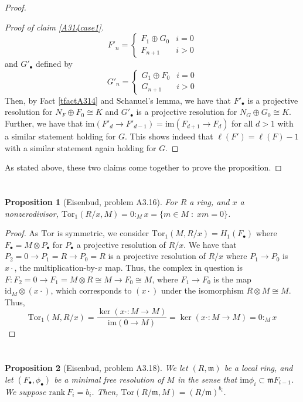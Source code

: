 \documentclass[english]{article}
\newcommand{\mfr}{\mathfrak{m}}
\newenvironment{subproof}[1][\proofname]{%
	\renewcommand{\qedsymbol}{$\blacksquare$}%
	\begin{proof}[#1]%
	}{%
	\end{proof}%
}
\newcommand{\prob}[1]{\setcounter{section}{#1-1}\section{}}
\newtheorem*{prop*}{Proposition}
\theoremstyle{remark}
\theoremstyle{definition}
\newcommand{\id}{\mathrm{id}}
\newcommand{\im}{\mathrm{im}}
\newcommand{\tor}{\mathrm{Tor}}
\newcommand{\col}[3]{{#1}:_{#2}{#3}}
\newcommand{\rank}{\mathrm{rank}~}
\begin{document}
\begin{proof}
\begin{subproof}[Proof of claim \ref{A314case1}]
\begin{equation*}
F'_n=\begin{cases}
F_1\oplus G_0& i=0\\
F_{n+1}&i>0
\end{cases}
\end{equation*}
and $G'_\bullet $ defined by \begin{equation*}
G'_n=\begin{cases}
G_1\oplus F_0& i=0\\
G_{n+1}&i>0
\end{cases}
\end{equation*} Then, by Fact \ref{tfactA314} and Schanuel's lemma, we have that $F'_\bullet$ is a projective resolution for $N_F\oplus F_0\cong K$ and $G'_\bullet$ is a projective resolution for $N_G\oplus G_0\cong K$. Further, we have that $\im(F'_d\to F'_{d-1})=\im(F_{d+1}\to F_d)$ for all $d>1$ with a similar statement holding for $G$. This shows indeed that $\ell(F')=\ell(F)-1$ with a similar statement again holding for $G$.

\end{subproof}
As stated above, these two claims come together to prove the proposition.
\end{proof}
%
%
%
\prob{31}
\begin{prop*}[Eisenbud, problem A3.16]
	For $R$ a ring, and $x$ a nonzerodivisor, $\tor_1(R/x,M)=\col{0}{M}{x}=\{m\in M\;:\;xm=0\}$.
\end{prop*}
\begin{proof}
	As $\tor$ is symmetric, we consider $\tor_1(M,R/x)=H_1(F_\bullet)$ where $F_\bullet=M\otimes P_\bullet$ for $P_\bullet$ a projective resolution of $R/x$. We have that $P_2=0\to P_1=R\to P_0=R$ is a projective resolution of $R/x$ where $P_1\to P_0$ is $x\cdot$, the multiplication-by-$x$ map. Thus, the complex in question is $F: F_2=0\to F_1=M\otimes R\cong M\to F_0\cong M$, where $F_1\to F_0$ is the map $\id_M\otimes (x\cdot)$, which corresponds to $(x\cdot)$ under the isomorphism $R\otimes M\cong M$. Thus, $$\tor_1(M,R/x)=\frac{\ker(x\cdot:M\to M)}{\im(0\to M)}=\ker(x\cdot:M\to M)=\col{0}{M}{x}$$
\end{proof}
%
%
\prob{32}\begin{prop*}[Eisenbud, problem A3.18]
	We let $(R,\mfr)$ be a local ring, and let $(F_\bullet,\phi_\bullet) $ be a minimal free resolution of $M$ in the sense that $\im\phi_i\subset \mfr F_{i-1}$. We suppose $\rank F_i=b_i$. Then, $\tor(R/\mfr,M)=(R/\mfr)^{b_i}$.
\end{prop*}
\end{document}
